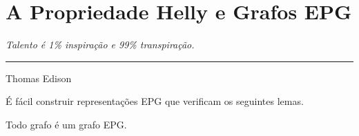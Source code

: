 \chapter{A Propriedade Helly e Grafos EPG}

\begin{flushright}
\begin{minipage}[t][0cm][b]{0.47\textwidth}
\emph{
Talento é 1\% inspiração e 99\% transpiração. }
\end{minipage}

\rule[0cm]{7cm}{0.03cm}%

Thomas Edison
\end{flushright}


É fácil construir representações EPG que verificam os seguintes lemas. 

 
 \begin{lema} \cite{golumbic2009} \label{lem:todoGrafoEpg}
 Todo grafo é um grafo EPG.
 \end{lema}
 
 
 
